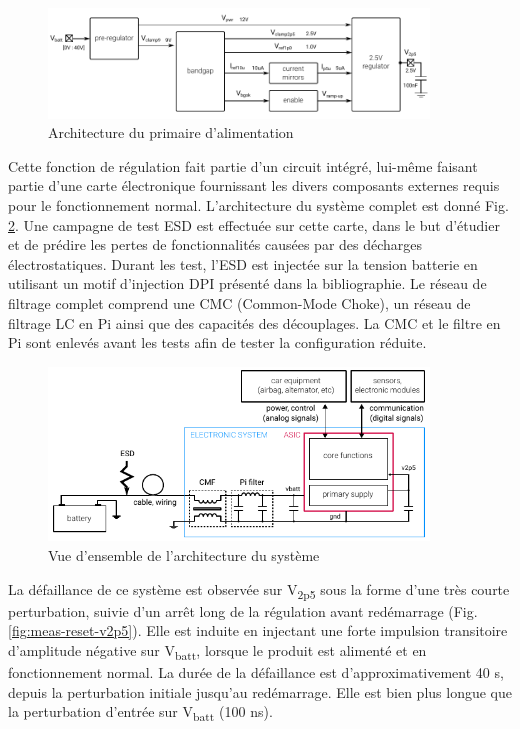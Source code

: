 \begin{figure}[!h]
  \centering
  \includegraphics[width=0.9\textwidth]{src/1/figures/monitored_function.pdf}
  \caption{Architecture du primaire d'alimentation}
  \label{fig:monitored_function}
\end{figure}

Cette fonction de régulation fait partie d'un circuit intégré, lui-même faisant partie d'une carte électronique fournissant les divers composants externes requis pour le fonctionnement normal.
L'architecture du système complet est donné Fig. \ref{fig:system_architecture}.
Une campagne de test ESD est effectuée sur cette carte, dans le but d'étudier et de prédire les pertes de fonctionnalités causées par des décharges électrostatiques.
Durant les test, l'ESD est injectée sur la tension batterie en utilisant un motif d'injection DPI \cite{iec62132-4} présenté dans la bibliographie.
Le réseau de filtrage complet comprend une CMC (Common-Mode Choke), un réseau de filtrage LC en Pi ainsi que des capacités des découplages.
La CMC et le filtre en Pi sont enlevés avant les tests afin de tester la configuration réduite.

\begin{figure}[!h]
  \centering
  \includegraphics[width=0.9\textwidth]{src/1/figures/architecture_system.pdf}
  \caption{Vue d'ensemble de l'architecture du système}
  \label{fig:system_architecture}
\end{figure}


La défaillance de ce système est observée sur V\textsubscript{2p5} sous la forme d'une très courte perturbation, suivie d'un arrêt long de la régulation avant redémarrage (Fig. \ref{fig:meas-reset-v2p5}).
Elle est induite en injectant une forte impulsion transitoire d'amplitude négative sur V\textsubscript{batt}, lorsque le produit est alimenté et en fonctionnement normal.
La durée de la défaillance est d'approximativement 40 \textmu{}s, depuis la perturbation initiale jusqu'au redémarrage.
Elle est bien plus longue que la perturbation d'entrée sur V\textsubscript{batt} (100 ns).

